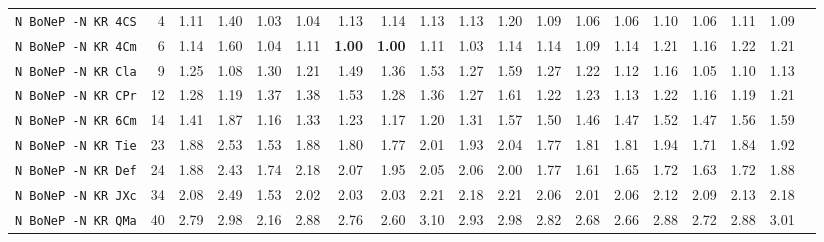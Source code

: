 \begin{tabular}{l | r @{~~} r | r@{~~}r@{~~}r@{~~}r@{~~}r@{~~}r@{~~}r@{~~}r@{~~}r@{~~}r@{~~}r@{~~}r@{~~}r@{~~}r@{~~}r@{~~}r|}
\verb+N BoNeP -N KR 4CS+ & 4 & 1.11 & 1.40&1.03&1.04&1.13&1.14&1.13&1.13&1.20&1.09&1.06&1.06&1.10&1.06&1.11&1.09\\
\verb+N BoNeP -N KR 4Cm+ & 6 & 1.14 & 1.60&1.04&1.11&\textbf{1.00}&\textbf{1.00}&1.11&1.03&1.14&1.14&1.09&1.14&1.21&1.16&1.22&1.21\\
\verb+N BoNeP -N KR Cla+ & 9 & 1.25 & 1.08&1.30&1.21&1.49&1.36&1.53&1.27&1.59&1.27&1.22&1.12&1.16&1.05&1.10&1.13\\
\verb+N BoNeP -N KR CPr+ & 12 & 1.28 & 1.19&1.37&1.38&1.53&1.28&1.36&1.27&1.61&1.22&1.23&1.13&1.22&1.16&1.19&1.21\\
\verb+N BoNeP -N KR 6Cm+ & 14 & 1.41 & 1.87&1.16&1.33&1.23&1.17&1.20&1.31&1.57&1.50&1.46&1.47&1.52&1.47&1.56&1.59\\
\verb+N BoNeP -N KR Tie+ & 23 & 1.88 & 2.53&1.53&1.88&1.80&1.77&2.01&1.93&2.04&1.77&1.81&1.81&1.94&1.71&1.84&1.92\\
\verb+N BoNeP -N KR Def+ & 24 & 1.88 & 2.43&1.74&2.18&2.07&1.95&2.05&2.06&2.00&1.77&1.61&1.65&1.72&1.63&1.72&1.88\\
\verb+N BoNeP -N KR JXc+ & 34 & 2.08 & 2.49&1.53&2.02&2.03&2.03&2.21&2.18&2.21&2.06&2.01&2.06&2.12&2.09&2.13&2.18\\
\verb+N BoNeP -N KR QMa+ & 40 & 2.79 & 2.98&2.16&2.88&2.76&2.60&3.10&2.93&2.98&2.82&2.68&2.66&2.88&2.72&2.88&3.01\\
\end{tabular}
